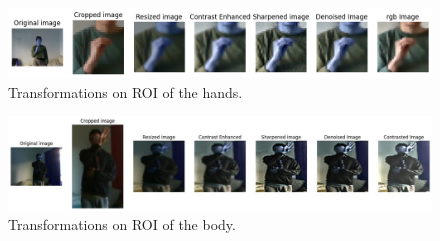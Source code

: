 \documentclass[10pt,twocolumn,letterpaper]{article}
\begin{document}
\begin{figure}[h]
   \centering
   \includegraphics[width=\textwidth]{images/transformation_hands.jpg} 
   \caption{Transformations on ROI of the hands.}
   \label{fig:transformation_hands}
\end{figure}
\begin{figure}[h]
   \centering
   \includegraphics[width=\textwidth]{images/transformation_body.jpg} 
   \caption{Transformations on ROI of the body.}
   \label{fig:transformation_body}
\end{figure}
\end{document}
